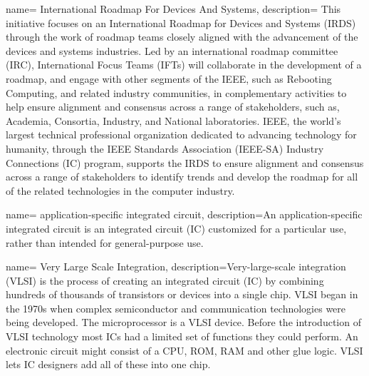 {
        name= International Roadmap For Devices And Systems,
        description={ This initiative focuses on an International Roadmap for Devices and Systems (IRDS) through the work of roadmap teams closely aligned with the advancement of the devices and systems industries. Led by an international roadmap committee (IRC), International Focus Teams (IFTs) will collaborate in the development of a roadmap, and engage with other segments of the IEEE, such as Rebooting Computing, and related industry communities, in complementary activities to help ensure alignment and consensus across a range of stakeholders, such as, Academia, Consortia, Industry, and National laboratories. IEEE, the world's largest technical professional organization dedicated to advancing technology for humanity, through the IEEE Standards Association (IEEE-SA) Industry Connections (IC) program, supports the IRDS to ensure alignment and consensus across a range of stakeholders to identify trends and develop the roadmap for all of the related technologies in the computer industry.}
}

{
        name= application-specific integrated circuit,
        description={An application-specific integrated circuit is an integrated circuit (IC) customized for a particular use, rather than intended for general-purpose use.}
}

{
        name= Very Large Scale Integration,
        description={Very-large-scale integration (VLSI) is the process of creating an integrated circuit (IC) by combining hundreds of thousands of transistors or devices into a single chip. VLSI began in the 1970s when complex semiconductor and communication technologies were being developed. The microprocessor is a VLSI device. Before the introduction of VLSI technology most ICs had a limited set of functions they could perform. An electronic circuit might consist of a CPU, ROM, RAM and other glue logic. VLSI lets IC designers add all of these into one chip.}
}



